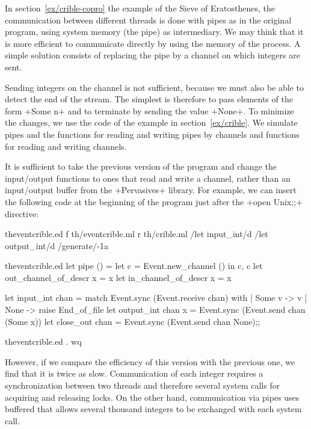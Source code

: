 \begin{example}
In section~\ref{ex/crible-copro} the example of the Sieve of Eratosthenes,
the communication between different threads is done with pipes as in
the original program, using system memory (the pipe) as intermediary.
We may think that it is more efficient to communicate
directly by using the memory of the process.  A simple solution
consists of replacing the pipe by a channel on which integers are sent.

Sending integers on the channel is not sufficient, because we must
also be able to detect the end of the stream.  The simplest is
therefore to pass elements of the form \ml+Some n+ and to terminate by
sending the value \ml+None+.  To minimize the changes, we use the code
of the example in section~\ref{ex/crible}.  We simulate pipes and the
functions for reading and writing pipes by channels and functions for
reading and writing channels.

It is sufficient to take the previous version of the program and
change the input/output functions to ones that read and write a channel,
rather than an input/output buffer from the \ml+Pervasives+ library.
For example, we can insert the following code at the beginning of the
program just after the \ml+open Unix;;+ directive:
%
\begin{codefile}{theventcrible.ed}
f th/eventcrible.ml
r th/crible.ml
/let input_int/d
/let output_int/d
/generate/-1a
\end{codefile}
%
\begin{listingcodefile}{theventcrible.ed}
let pipe () = let c = Event.new_channel () in c, c
let out_channel_of_descr x = x
let in_channel_of_descr x = x

let input_int chan = 
  match Event.sync (Event.receive chan) with
  | Some v -> v 
  | None -> raise End_of_file
let output_int chan x = Event.sync (Event.send chan (Some x))
let close_out chan = Event.sync (Event.send chan None);;
\end{listingcodefile}
%
\begin{codefile}{theventcrible.ed}
.
wq
\end{codefile}

However, if we compare the efficiency of this version with the
previous one, we find that it is twice as slow.  Communication of each
integer requires a synchronization between two threads and therefore
several system calls for acquiring and releasing locks.  On the other
hand, communication via pipes uses buffered \io{} that allows several
thousand integers to be exchanged with each system call.


\end{example}
